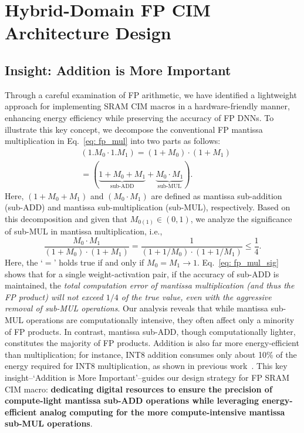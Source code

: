 
\section{Hybrid-Domain FP CIM Architecture Design}

\subsection{Insight: Addition is More Important}
\label{sec: addition}


Through a careful examination of FP arithmetic, we have identified a lightweight approach for implementing SRAM CIM macros in a hardware-friendly manner, enhancing energy efficiency while preserving the accuracy of FP DNNs. To illustrate this key concept, we decompose the conventional FP mantissa multiplication in Eq.~\eqref{eq: fp_mul} into two parts as follows:
\begin{equation}
\begin{split}
&(1.M_0\cdot 1.M_1)=(1+M_0)\cdot (1+M_1)\\
 &=(\underset{\text{sub-ADD}}{\underbrace{1+M_0+M_1}}+ \underset{\text{sub-MUL}}{\underbrace{M_0 \cdot M_1}}).
\end{split}
    \label{eq: fp_mul_1}
\end{equation}
Here, $(1+M_0+M_1)$ and $(M_0\cdot M_1)$ are defined as mantissa sub-addition (sub-ADD) and mantissa sub-multiplication (sub-MUL), respectively.
Based on this decomposition and given that $M_{0(1)}\in(0,1)$, we analyze the significance of sub-MUL in mantissa multiplication\cite{cao2024addition}, i.e.,
\begin{equation}
\dfrac{M_0 \cdot M_1}{(1+M_0)\cdot(1+M_1)}=\dfrac{1}{(1+1/M_0)\cdot(1+1/M_1)}\leq \dfrac{1}{4}.
\label{eq: fp_mul_sig}
\end{equation}
Here, the `$=$' holds true if and only if $M_0=M_1	\rightarrow 1$.
Eq.~\eqref{eq: fp_mul_sig} shows that for a single weight-activation pair, if the accuracy of sub-ADD is maintained, the \textit{total computation error of mantissa multiplication (and thus the FP product) will not exceed $1/4$ of the true value, even with the aggressive removal of sub-MUL operations}. 
Our analysis reveals that while mantissa sub-MUL operations are computationally intensive, they often affect only a minority of FP products. 
In contrast, mantissa sub-ADD, though computationally lighter, constitutes the majority of FP products. Addition is also far more energy-efficient than multiplication; for instance, INT8 addition consumes only about 10\% of the energy required for INT8 multiplication, as shown in previous work~\cite{TPU}.
This key insight--`Addition is More Important'--guides our design strategy for FP SRAM CIM macro: \textbf{dedicating digital resources to ensure the precision of compute-light mantissa sub-ADD operations while leveraging energy-efficient analog computing for the more compute-intensive mantissa sub-MUL operations}.




